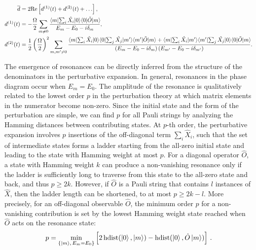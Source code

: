 \documentclass[english,floatfix,twocolumn,showpacs, aps, prx, reprint, superscriptaddress, longbibliography]{revtex4-2}
\begin{document}
\begin{align}
\overline{d} &= 2\mathrm{Re} \left[ d^{(1)} (t) + d^{(2)} (t) + \hdots \right] , \label{eq:operator_pt} \\
d^{(1)} (t) &= -\frac{\Omega}{2} \sum_{m \neq 0} \frac{\!\mel{m}{\sum_i\hat{X_i}}{0}\! \!\mel{0}{\tilde{O}}{m}\!}{E_m-E_0-i\delta_m} , \notag \\
d^{(2)} (t) &= \frac{1}{2} \left(\frac{\Omega}{2}\right)^2 \sum_{m, m'\neq 0} \frac{\!\mel{m}{\sum_i\hat{X_i}}{0}\! \!\mel{0}{\sum_j\hat{X_j}}{m'}\! \!\mel{m'}{\tilde{O}}{m} + \!\mel{m}{\sum_i\hat{X_i}}{m'}\! \!\mel{m'}{\sum_j\hat{X_j}}{0}\! \!\mel{0}{\tilde{O}}{m}\!}{\left(E_m-E_0-i\delta_m\right) \left(E_{m'}-E_0-i\delta_{m'}\right)} . \notag
\end{align}

The emergence of resonances can be directly inferred from the structure of the denominators in the perturbative expansion. In general, resonances in the phase diagram occur when $E_m = E_0$. The amplitude of the resonance is qualitatively related to the lowest order $p$ in the perturbation theory at which matrix elements in the numerator become non-zero. Since the initial state and the form of the perturbation are simple, we can find $p$ for all Pauli strings by analyzing the Hamming distances between contributing states. At $p$-th order, the perturbative expansion involves $p$ insertions of the off-diagonal term $\sum_i \hat{X}_i$, such that the set of intermediate states forms a ladder starting from the all-zero initial state and leading to the state with Hamming weight at most $p$. For a diagonal operator $\hat{O}$, a state with Hamming weight $k$ can produce a non-vanishing resonance only if the ladder is sufficiently long to traverse from this state to the all-zero state and back, and thus $p \geq 2k$. However, if $\hat{O}$ is a Pauli string that contains $l$ instances of $\hat{X}$, then the ladder length can be shortened, to at most $p \geq 2k-l$. More precisely, for an off-diagonal observable $\hat{O}$, the minimum order $p$ for a non-vanishing contribution is set by the lowest Hamming weight state reached when $\hat{O}$ acts on the resonance state:
\begin{equation}
p = \min_{\{\ket{m},\, E_m=E_0\}} \left[ 2\, \mathrm{hdist}(\ket{0}, \ket{m}) - \mathrm{hdist}(\ket{0}, \hat{O}\ket{m}) \right] \, .
\label{eq:perturbation_result}
\end{equation}
\end{document}
